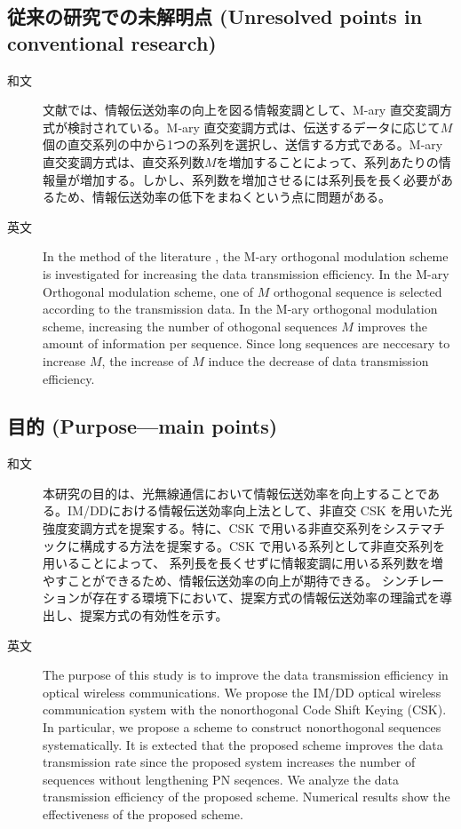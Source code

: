 ﻿\documentclass[a4j,10pt]{jarticle}
\begin{document}
\subsection{従来の研究での未解明点 (Unresolved points in conventional research)}
\begin{description}
 \item[和文] 文献\cite{csk1}\cite{csk2}では、情報伝送効率の向上を図る情報変調として、M-ary 直交変調方式が検討されている。M-ary 直交変調方式は、伝送するデータに応じて$M$個の直交系列の中から1つの系列を選択し、送信する方式である。M-ary 直交変調方式は、直交系列数$M$を増加することによって、系列あたりの情報量が増加する。しかし、系列数を増加させるには系列長を長く必要があるため、情報伝送効率の低下をまねくという点に問題がある。
%
 \item[英文] In the method of the literature \cite{csk1}\cite{csk2}, the M-ary orthogonal modulation scheme is investigated for increasing the data transmission efficiency. In the M-ary Orthogonal modulation scheme, one of $M$ orthogonal sequence is selected according to the transmission data. In the M-ary orthogonal modulation scheme, increasing the number of othogonal sequences $M$ improves the amount of information per sequence. Since long sequences are neccesary to increase $M$, the increase of $M$ induce the decrease of data transmission efficiency. 
\end{description}
%
\subsection{目的 (Purpose---main points)}
\begin{description}
 \item[和文] 本研究の目的は、光無線通信において情報伝送効率を向上することである。IM/DDにおける情報伝送効率向上法として、非直交 CSK を用いた光強度変調方式を提案する。特に、CSK で用いる非直交系列をシステマチックに構成する方法を提案する。CSK で用いる系列として非直交系列を用いることによって、
系列長を長くせずに情報変調に用いる系列数を増やすことができるため、情報伝送効率の向上が期待できる。
シンチレーションが存在する環境下において、提案方式の情報伝送効率の理論式を導出し、提案方式の有効性を示す。
%
 \item[英文] The purpose of this study is to improve the data transmission efficiency in optical wireless communications. We propose the IM/DD optical wireless communication system with the nonorthogonal Code Shift Keying (CSK). In particular, we propose a scheme to construct nonorthogonal sequences systematically. It is extected that the proposed scheme improves the data transmission rate since the proposed system increases the number of sequences without lengthening PN seqences. We analyze the data transmission efficiency of the proposed scheme. Numerical results show the effectiveness of the proposed scheme.
\end{description}
%
\end{document}
